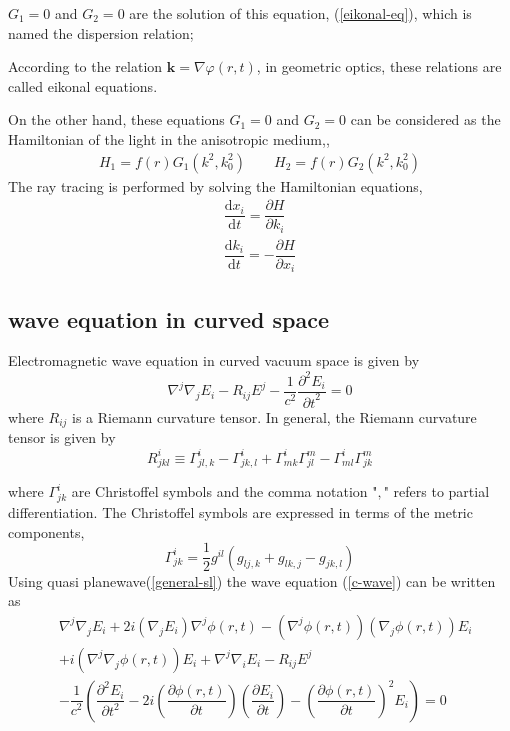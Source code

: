 \documentclass[9pt,twocolumn,twoside]{osajnl}
\begin{document}
$G_{1}=0$ and $G_{2}=0$ are the solution of this equation, (\ref{eikonal-eq}), which is named the dispersion relation; 

According to the relation $\mathbf{k}=\nabla{\varphi(r,t)}$, in geometric optics, these relations are called eikonal equations. 

On the other hand, these equations $G_{1}=0$ and $G_{2}=0$ can be considered as the Hamiltonian of the light in the anisotropic medium,\cite{schurig2006calculation, sluijter2008general}, 
\begin{eqnarray}
H_{1}=f(r)G_{1}(k^2,k^2_{0}) \qquad H_{2}=f(r)G_{2}(k^2,k^2_{0})
\end{eqnarray}
The ray tracing is performed by solving the Hamiltonian equations,
\begin{eqnarray}\label{hamilton}
\dfrac{\mathrm{d}x_{i}}{\mathrm{d}t}=\dfrac{\partial{H}}{\partial{k_{i}}}\\
\dfrac{\mathrm{d}k_{i}}{\mathrm{d}t}=-\dfrac{\partial{H}}{\partial{x_{i}}}
\end{eqnarray}

\subsection{wave equation in curved space}
Electromagnetic wave equation in curved vacuum space is given by
\begin{equation}\label{c-wave}
\nabla^{j} \nabla_{j} E_{i} - R_{ij}E^{j}-\dfrac{1}{c^2} \dfrac{\partial^{2}E_{i}}{{\partial t}^{2}}=0
\end{equation}
where $R_{ij}$ is a Riemann curvature tensor. In general, the  Riemann curvature tensor is given by \cite{leonhardt2012geometry}
\begin{equation}\label{Riemann}
R^{i}_{jkl}\equiv \Gamma^{i}_{jl,k}-\Gamma^{i}_{jk,l}+\Gamma^{i}_{mk}\Gamma^{m}_{jl}-\Gamma^{i}_{ml}\Gamma^{m}_{jk}
\end{equation}

where $\Gamma^{i}_{jk}$ are Christoffel symbols and the comma notation "$,$" refers to partial differentiation.  The Christoffel symbols are expressed in terms of the metric components,
\begin{equation}\label{cr}
\Gamma^{i}_{jk}=\dfrac{1}{2} g^{il}(g_{lj,k}+g_{lk,j}-g_{jk,l})
\end{equation}
Using quasi planewave(\ref{general-sl}) the wave equation (\ref{c-wave}) can be written as \cite{leonhardt2012geometry}
\begin{equation}
\begin{split}
&\nabla^{j}\nabla_{j}E_{i}+2i(\nabla_{j}E_{i})\nabla^{j}{\phi(r,t)}-
(\nabla^{j}{\phi(r,t)})(\nabla_{j}{\phi(r,t)})E_{i}\\
 &+i(\nabla^{j}\nabla_{j}{\phi(r,t)})E_{i} + \nabla^{j}\nabla_{i}E_{i} -R_{ij}E^{j}  \\
&-\dfrac{1}{c^2}\left(\dfrac{\partial^2 E_{i}}{\partial t^2}-2i(\dfrac{\partial\phi(r,t)}{\partial t})(\dfrac{\partial E_{i}}{\partial t})-(\dfrac{\partial\phi(r,t)}{\partial t})^2 E_{i}\right)=0
\end{split}
\end{equation}
\end{document}
